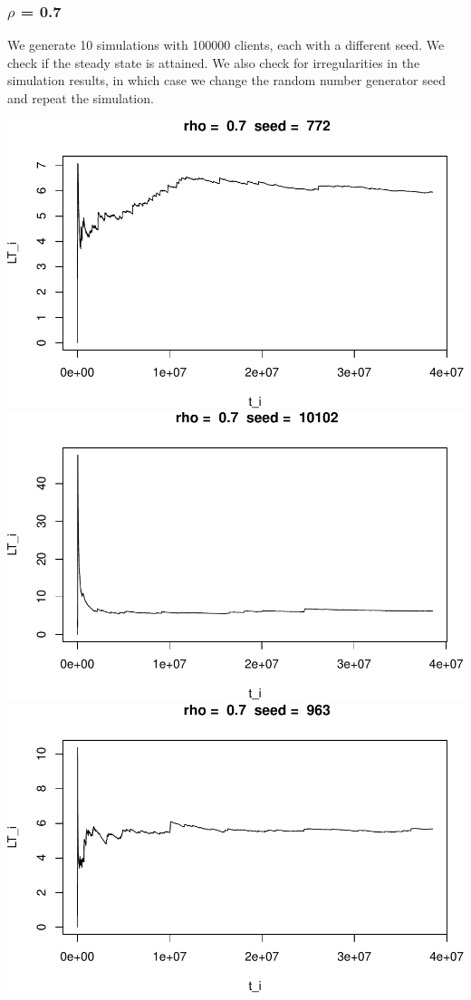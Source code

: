 \documentclass[]{article}
\begin{document}
\subsubsection{\texorpdfstring{\(\rho\) =
0.7}{\textbackslash{}rho = 0.7}}\label{rho-0.7}

We generate 10 simulations with 100000 clients, each with a different
seed. We check if the steady state is attained. We also check for
irregularities in the simulation results, in which case we change the
random number generator seed and repeat the simulation.

\includegraphics{003_files/figure-latex/unnamed-chunk-17-1.pdf}
\includegraphics{003_files/figure-latex/unnamed-chunk-17-2.pdf}
\includegraphics{003_files/figure-latex/unnamed-chunk-17-3.pdf}
\end{document}
